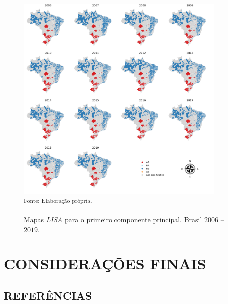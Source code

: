 \begin{figure}[H]
	\centering
	\caption{Mapas \textit{LISA} para o primeiro componente principal.  Brasil $2006$ -- $2019$.}
	\includegraphics[width=0.9\textwidth]{figuras/map_lisa_cp1.png}\\
	\small \textsuperscript {Fonte: Elaboração própria.}
    \label{map_lisa_cp1}
\end{figure}

\section{CONSIDERAÇÕES FINAIS}\label{sc-conclusion}

\newpage
{}
\begin{center}
\section*{REFERÊNCIAS} 
\end{center}

